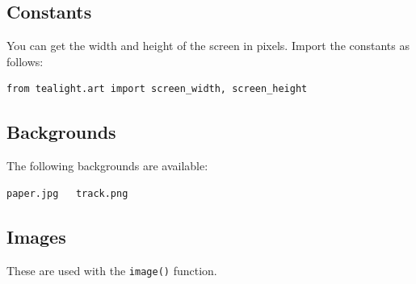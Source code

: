 \documentclass[12pt,a4paper,twoside]{article}
\renewcommand{\_}{\texttt{\symbol{95}}}
\begin{document}
\subsection{Constants}

You can get the width and height of the screen in pixels. Import the constants as follows:
\begin{verbatim}
from tealight.art import screen_width, screen_height
\end{verbatim}


\subsection{Backgrounds}
\label{backgrounds}

The following backgrounds are available:
\begin{verbatim}
paper.jpg   track.png
\end{verbatim}

\newpage
\subsection{Images}

These are used with the \verb^image()^ function.
\end{document}
